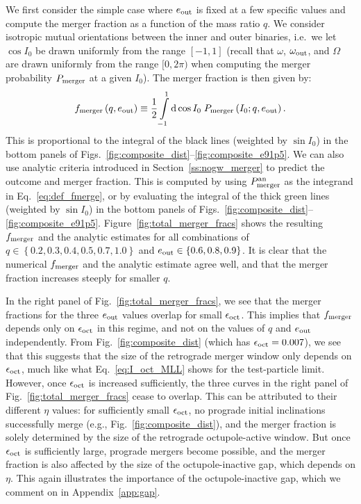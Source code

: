 \documentclass[
        fleqn,
        usenatbib,
    ]{mnras}
\newcommand*{\p}[1]{\left(#1\right)}
\newcommand*{\z}[1]{\left\{#1\right\}}
\begin{document}
We first consider the simple case where $e_{\rm out}$ is fixed at a few
specific values and compute the merger fraction as a function of the mass ratio
$q$. We consider isotropic mutual orientations between the inner and outer
binaries, i.e.\ we let $\cos I_0$ be drawn uniformly from the range $[-1, 1]$
(recall that $\omega$, $\omega_{\rm out}$, and $\Omega$ are drawn uniformly from
the range $[0, 2\pi)$ %
when computing the merger probability $P_{\rm merger}$ at a given $I_0$). The
merger fraction is then given by:
\begin{align}
    f_{\rm merger}\p{q, e_{\rm out}} \equiv
        \frac{1}{2}\int\limits_{-1}^1\mathrm{d}\cos I_0\;
            P_{\rm merger}\p{I_0; q, e_{\rm out}} .\label{eq:def_fmerge}
\end{align}
This is proportional to the integral of the black lines (weighted by $\sin I_0$)
in the bottom panels of
Figs.~\ref{fig:composite_dist}--\ref{fig:composite_e91p5}. We can also use
analytic criteria introduced in Section~\ref{ss:nogw_merger} to predict the
outcome and merger fraction. This is computed by using $P_{\rm merger}^{\rm an}$
as the integrand in Eq.~\eqref{eq:def_fmerge}, or by evaluating the integral of
the thick green lines (weighted by $\sin I_0$) in the bottom panels of
Figs.~\ref{fig:composite_dist}--\ref{fig:composite_e91p5}.
Figure~\ref{fig:total_merger_fracs} shows the resulting $f_{\rm merger}$ and the
analytic estimates for all combinations of $q \in \z{0.2, 0.3, 0.4, 0.5, 0.7,
1.0}$ and $e_{\rm out} \in \z{0.6, 0.8, 0.9}$. It is clear that the numerical
$f_{\rm merger}$ and the analytic estimate agree well, and that the merger
fraction increases steeply for smaller $q$.

In the right panel of Fig.~\ref{fig:total_merger_fracs}, we see that the merger
fractions for the three $e_{\rm out}$ values overlap for small $\epsilon_{\rm
oct}$. This implies that $f_{\rm merger}$ depends only on $\epsilon_{\rm oct}$
in this regime, and not on the values of $q$ and $e_{\rm out}$ independently.
From Fig.~\ref{fig:composite_dist} (which has $\epsilon_{\rm oct} = 0.007$), we
see that this suggests that the size of the retrograde merger window only
depends on $\epsilon_{\rm oct}$, much like what Eq.~\eqref{eq:I_oct_MLL} shows
for the test-particle limit. However, once $\epsilon_{\rm oct}$ is increased
sufficiently, the three curves in the right panel of
Fig.~\ref{fig:total_merger_fracs} cease to overlap. This can be attributed to
their different $\eta$ values: for sufficiently small $\epsilon_{\rm oct}$, no
prograde initial inclinations successfully merge (e.g.,
Fig.~\ref{fig:composite_dist}), and the merger fraction is solely determined by
the size of the retrograde octupole-active window. But once $\epsilon_{\rm oct}$
is sufficiently large, prograde mergers become possible, and the merger fraction
is also affected by the size of the octupole-inactive gap, which depends on
$\eta$. This again illustrates the importance of the octupole-inactive gap,
which we comment on in Appendix~\ref{app:gap}.
\end{document}
